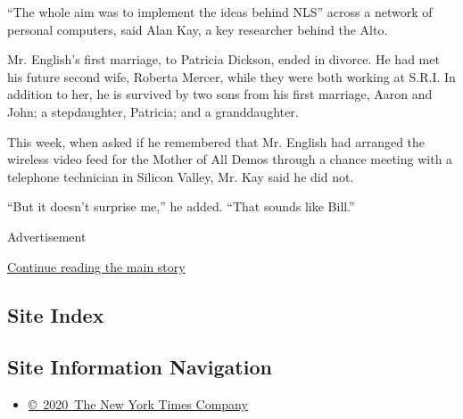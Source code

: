 ``The whole aim was to implement the ideas behind NLS'' across a network
of personal computers, said Alan Kay, a key researcher behind the Alto.

Mr. English's first marriage, to Patricia Dickson, ended in divorce. He
had met his future second wife, Roberta Mercer, while they were both
working at S.R.I. In addition to her, he is survived by two sons from
his first marriage, Aaron and John; a stepdaughter, Patricia; and a
granddaughter.

This week, when asked if he remembered that Mr. English had arranged the
wireless video feed for the Mother of All Demos through a chance meeting
with a telephone technician in Silicon Valley, Mr. Kay said he did not.

``But it doesn't surprise me,'' he added. ``That sounds like Bill.''

Advertisement

\protect\hyperlink{after-bottom}{Continue reading the main story}

\hypertarget{site-index}{%
\subsection{Site Index}\label{site-index}}

\hypertarget{site-information-navigation}{%
\subsection{Site Information
Navigation}\label{site-information-navigation}}

\begin{itemize}
\tightlist
\item
  \href{https://help.nytimes3xbfgragh.onion/hc/en-us/articles/115014792127-Copyright-notice}{©~2020~The
  New York Times Company}
\end{itemize}

